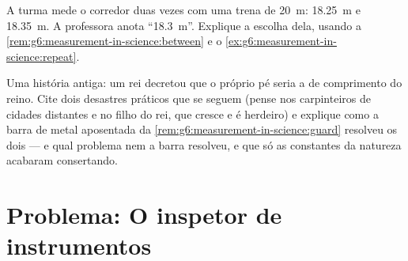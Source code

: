 \begin{exercise}[$\star\star$]\label{exo:g6:measurement-in-science:11}
A turma mede o corredor duas vezes com uma trena de \qty{20}{m}:
\qty{18.25}{m} e \qty{18.35}{m}. A professora anota
``\qty{18.3}{m}''. Explique a escolha dela, usando a
\cref{rem:g6:measurement-in-science:between} e o
\cref{ex:g6:measurement-in-science:repeat}.
\end{exercise}

\begin{exercise}[$\star\star\star$]\label{exo:g6:measurement-in-science:12}
Uma história antiga: um rei decretou que o próprio pé seria a 
de comprimento do reino. Cite dois desastres práticos que se seguem
(pense nos carpinteiros de cidades distantes e no filho do rei, que
cresce e é herdeiro) e explique como a barra de metal aposentada da
\cref{rem:g6:measurement-in-science:guard} resolveu os dois --- e
qual problema nem a barra resolveu, e que só as constantes da
natureza acabaram consertando.
\end{exercise}

\section{Problema: O inspetor de instrumentos}

